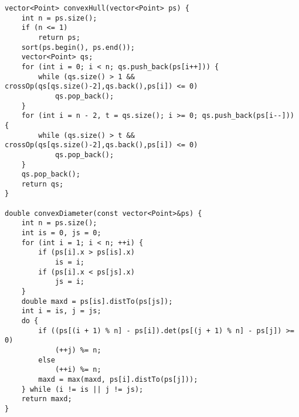 \begin{lstlisting}
vector<Point> convexHull(vector<Point> ps) {
	int n = ps.size();
	if (n <= 1)
		return ps;
	sort(ps.begin(), ps.end());
	vector<Point> qs;
	for (int i = 0; i < n; qs.push_back(ps[i++])) {
		while (qs.size() > 1 && crossOp(qs[qs.size()-2],qs.back(),ps[i]) <= 0)
			qs.pop_back();
	}
	for (int i = n - 2, t = qs.size(); i >= 0; qs.push_back(ps[i--])) {
		while (qs.size() > t && crossOp(qs[qs.size()-2],qs.back(),ps[i]) <= 0)
			qs.pop_back();
	}
	qs.pop_back();
	return qs;
}

double convexDiameter(const vector<Point>&ps) {
	int n = ps.size();
	int is = 0, js = 0;
	for (int i = 1; i < n; ++i) {
		if (ps[i].x > ps[is].x)
			is = i;
		if (ps[i].x < ps[js].x)
			js = i;
	}
	double maxd = ps[is].distTo(ps[js]);
	int i = is, j = js;
	do {
		if ((ps[(i + 1) % n] - ps[i]).det(ps[(j + 1) % n] - ps[j]) >= 0)
			(++j) %= n;
		else
			(++i) %= n;
		maxd = max(maxd, ps[i].distTo(ps[j]));
	} while (i != is || j != js);
	return maxd;
}
\end{lstlisting} 
